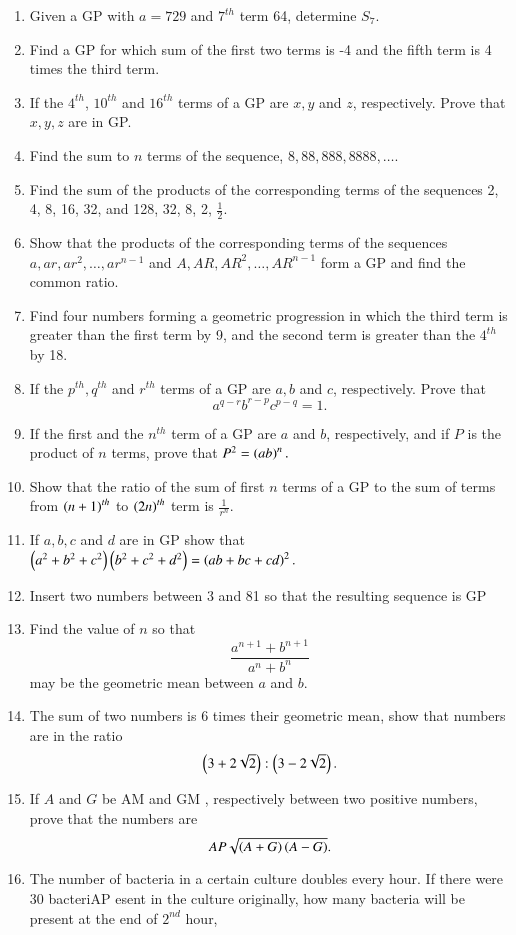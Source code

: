 \begin{enumerate}[label=\thesubsection.\arabic*.,ref=\thesubsection.\theenumi]
\item Given a GP  with $a = 729$ and $7^{th}$ term 64, determine $S_7$.
\item Find a GP  for which sum of the first two terms is -4 and the fifth term is 4 times the third term.
\item If the $4^{th}$, $10^{th}$ and $16^{th}$ terms of a GP  are $x, y$ and $z$, respectively. Prove that $x, y, z$ are in GP.
\item Find the sum to $n$ terms of the sequence, $8, 88, 888, 8888, \dots$. 
\item Find the sum of the products of the corresponding terms of the sequences 2, 4, 8, 16, 32, and 128, 32, 8, 2, $\frac{1}{2}$.
\item Show that the products of the corresponding terms of the sequences $a, ar, ar^2,\dots,  ar^{n-1}$ and $A, AR, AR^2,\dots,  AR^{n -1}$ form a GP  and find the common ratio.
\item Find four numbers forming a geometric progression in which the third term is greater than the first term by 9, and the second term is greater than the $4^{th}$ by 18.
\item If the $p^{th}, q^{th}$ and $r^{th}$ terms of a GP  are $a, b$ and $c$, respectively. Prove that 
$$a^{q-r} b^{r-p} c^{p-q} = 1.$$
\item If the first and the $n^{th}$ term of a GP  are $a$ and $b$, respectively, and if $P$ is the product of $n$ terms, prove that $P^2 = \left(ab\right)^n.$
\item Show that the ratio of the sum of first $n$ terms of a GP  to the sum of terms from $\left(n+1\right)^{th}$ to $\left(2n\right)^{th}$ term is $\frac{1}{r^n}$.
\item If $a, b, c$ and $d$ are in GP  show that $\left(a^2 + b^2 + c^2\right)\left(b^2 + c^2 + d^2\right) = \left(ab + bc + cd\right)^2.$
\item Insert two numbers between 3 and 81 so that the resulting sequence is GP 
\item Find the value of $n$ so that $$\frac{a^{n + 1} + b^{n + 1}}{a^n + b^n}$$ may be the geometric mean between $a$ and $b$.
\item The sum of two numbers is 6 times their geometric mean, show that numbers are in the ratio $$\left(3+2\sqrt{2}\right):\left(3-2\sqrt{2}\right).$$
\item If $A$ and $G$ be AM  and GM , respectively between two positive numbers, prove that the numbers are $$AP  \sqrt{\left(A+G\right)\left(A-G\right)}.$$
\item The number of bacteria in a certain culture doubles every hour. If there were 30 bacteriAP esent in the culture originally, how many bacteria will be present at the end of $2^{nd}$ hour, 

\end{enumerate}
